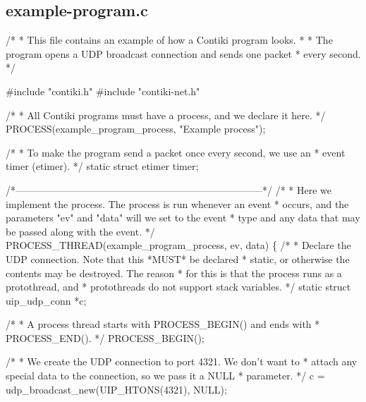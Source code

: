 \hypertarget{a00004}{}\subsection{example-\/program.\+c}

\begin{DoxyCodeInclude}
\textcolor{comment}{/*}
\textcolor{comment}{ * This file contains an example of how a Contiki program looks.}
\textcolor{comment}{ *}
\textcolor{comment}{ * The program opens a UDP broadcast connection and sends one packet}
\textcolor{comment}{ * every second.}
\textcolor{comment}{ */}

\textcolor{preprocessor}{#include "contiki.h"}
\textcolor{preprocessor}{#include "contiki-net.h"}

\textcolor{comment}{/*}
\textcolor{comment}{ * All Contiki programs must have a process, and we declare it here.}
\textcolor{comment}{ */}
PROCESS(example\_program\_process, \textcolor{stringliteral}{"Example process"});

\textcolor{comment}{/*}
\textcolor{comment}{ * To make the program send a packet once every second, we use an}
\textcolor{comment}{ * event timer (etimer).}
\textcolor{comment}{ */}
\textcolor{keyword}{static} \textcolor{keyword}{struct }etimer timer;

\textcolor{comment}{/*---------------------------------------------------------------------------*/}
\textcolor{comment}{/*}
\textcolor{comment}{ * Here we implement the process. The process is run whenever an event}
\textcolor{comment}{ * occurs, and the parameters "ev" and "data" will we set to the event}
\textcolor{comment}{ * type and any data that may be passed along with the event.}
\textcolor{comment}{ */}
PROCESS\_THREAD(example\_program\_process, ev, data)
\{
  \textcolor{comment}{/*}
\textcolor{comment}{   * Declare the UDP connection. Note that this *MUST* be declared}
\textcolor{comment}{   * static, or otherwise the contents may be destroyed. The reason}
\textcolor{comment}{   * for this is that the process runs as a protothread, and}
\textcolor{comment}{   * protothreads do not support stack variables.}
\textcolor{comment}{   */}
  \textcolor{keyword}{static} \textcolor{keyword}{struct }uip\_udp\_conn *c;
  
  \textcolor{comment}{/*}
\textcolor{comment}{   * A process thread starts with PROCESS\_BEGIN() and ends with}
\textcolor{comment}{   * PROCESS\_END().}
\textcolor{comment}{   */}  
  PROCESS\_BEGIN();

  \textcolor{comment}{/*}
\textcolor{comment}{   * We create the UDP connection to port 4321. We don't want to}
\textcolor{comment}{   * attach any special data to the connection, so we pass it a NULL}
\textcolor{comment}{   * parameter.}
\textcolor{comment}{   */}
  c = udp\_broadcast\_new(UIP\_HTONS(4321), NULL);
  

\end{DoxyCodeInclude}
